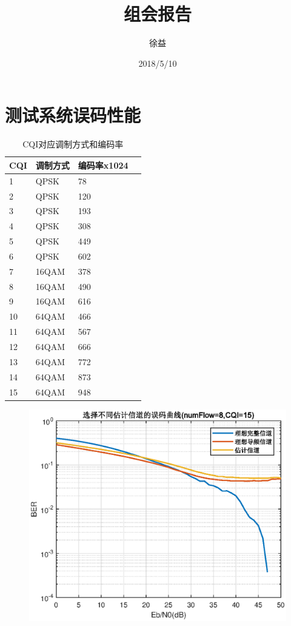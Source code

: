 \documentclass{article}
\title{组会报告}
\author{徐益}
\date{2018/5/10}
\begin{document}
	
\maketitle



\section{测试系统误码性能}
\begin{table}[H]
	\caption{CQI对应调制方式和编码率}
	\centering
	\begin{tabular}{|l|l|l|l|}%
		\hline  %
		CQI &	调制方式	&	编码率x1024	\\
		\hline
		1	&	QPSK		&	78	\\
		\hline
		2	&	QPSK		&	120	\\
		\hline
		3	&	QPSK		&	193	\\
		\hline
		4	&	QPSK		&	308	\\
		\hline
		5	&	QPSK		&	449	\\
		\hline
		6	&	QPSK		&	602	\\
		\hline
		7	&	16QAM		&	378	\\
		\hline
		8	&	16QAM		&	490	\\
		\hline
		9	&	16QAM		&	616	\\
		\hline
		10	&	64QAM		&	466	\\
		\hline
		11	&	64QAM		&	567	\\
		\hline
		12	&	64QAM		&	666	\\
		\hline
		13	&	64QAM		&	772	\\
		\hline
		14	&	64QAM		&	873	\\
		\hline
		15	&	64QAM		&	948	\\
		\hline  %
	\end{tabular}
\end{table}
\begin{figure}[H]
	\centering
	\includegraphics[width = .6\textwidth]{plot/plot_CQI15.eps}
\end{figure}
\end{document}
